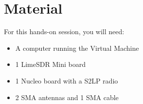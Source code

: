 \section*{Material}

\begin{comment}[couleur = gray!20, arrondi = 0.2, logo=\bcinfo]{}
\vspace{0.2cm}
\end{comment}
For this hands-on session, you will need:
\begin{itemize}
    \item A computer running the Virtual Machine
    \item 1 LimeSDR Mini board
    \item 1 Nucleo board with a S2LP radio
    \item 2 SMA antennas and 1 SMA cable
\end{itemize}
